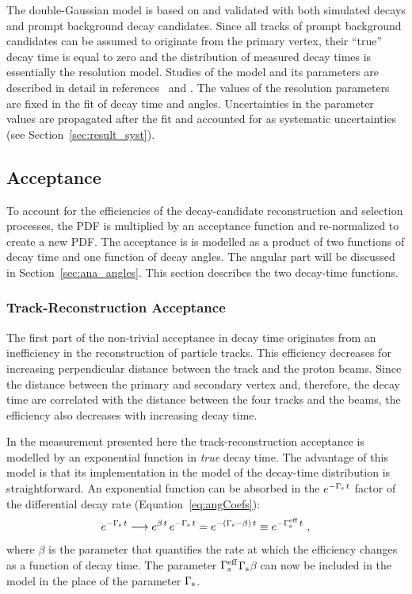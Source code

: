 The double-Gaussian model is based on and validated with both simulated \BstoJpsiKK{} decays and prompt background decay candidates. Since
all tracks of prompt background candidates can be assumed to originate from the primary vertex, their ``true'' decay time is equal to zero
and the distribution of measured decay times is essentially the resolution model. Studies of the model and its parameters are described in
detail in references~\cite{Aaij:2015} and \cite{LHCb-ANA-2014-039}. The values of the resolution parameters are fixed in the fit of decay
time and angles. Uncertainties in the parameter values are propagated after the fit and accounted for as systematic uncertainties (see
Section~\ref{sec:result_syst}).


\subsection{Acceptance}
\label{subsec:ana_time_acc}

To account for the efficiencies of the decay-candidate reconstruction and selection processes, the PDF is multiplied by an acceptance
function and re-normalized to create a new PDF. The acceptance is is modelled as a product of two functions of decay time and one function
of decay angles. The angular part will be discussed in Section~\ref{sec:ana_angles}. This section describes the two decay-time functions.

\subsubsection{Track-Reconstruction Acceptance}
The first part of the non-trivial acceptance in decay time originates from an inefficiency in the reconstruction of particle tracks. This
efficiency decreases for increasing perpendicular distance between the track and the proton beams. Since the distance between the primary
and secondary vertex and, therefore, the decay time are correlated with the distance between the four \BstoJpsiKK{} tracks and the beams,
the efficiency also decreases with increasing decay time.

In the measurement presented here the track-reconstruction acceptance is modelled by an exponential function in \emph{true} decay time. The
advantage of this model is that its implementation in the model of the decay-time distribution is straightforward. An exponential function
can be absorbed in the $e^{-\Gamma_\text{s}\,t}$ factor of the differential decay rate (Equation~\ref{eq:angCoefs}):
\begin{equation}
  e^{-\Gamma_\text{s}\,t} \longrightarrow e^{\beta\,t}\,e^{-\Gamma_\text{s}\,t} = e^{-(\Gamma_\text{s}-\beta)\,t} \equiv e^{-\Gamma_\text{s}^\text{eff}\,t}\ ,
\end{equation}
where $\beta$ is the parameter that quantifies the rate at which the efficiency changes as a function of decay time. The parameter
$\Gamma_\text{s}^\text{eff}$\textequiv$\Gamma_\text{s}$\textminus$\beta$ can now be included in the model in the place of the parameter $\Gamma_\text{s}$.

